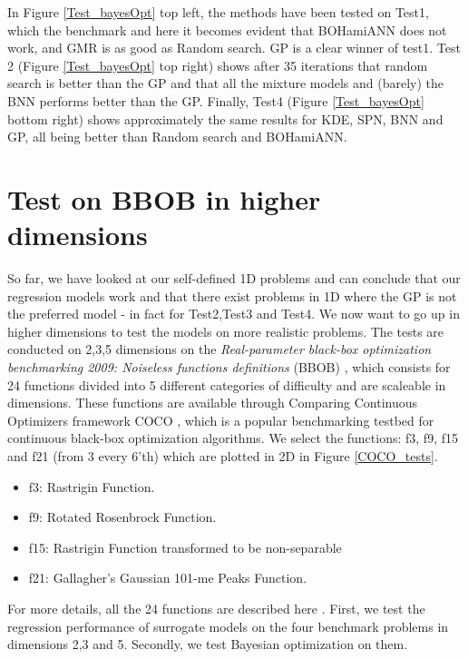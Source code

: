 In Figure \ref{Test_bayesOpt} top left, the methods have been tested on Test1, which the benchmark
and here it becomes evident that BOHamiANN does not work, and GMR is as good as Random search. GP is
a clear winner of test1. Test 2 (Figure \ref{Test_bayesOpt} top right) shows after 35 iterations
that random search is better than the GP and that all the mixture models and (barely) the BNN
performs better than the GP. Finally, Test4 (Figure \ref{Test_bayesOpt} bottom right) shows
approximately the same results for KDE, SPN, BNN and GP, all being better than Random search and
BOHamiANN. 

\section{Test on BBOB in higher dimensions}
So far, we have looked at our self-defined 1D problems and can conclude that our regression models
work and that there exist problems in 1D where the GP is not the preferred model - in fact for
Test2,Test3 and Test4. We now want to go up in higher dimensions to test the models on more
realistic problems. The tests are conducted on 2,3,5 dimensions on the \textit{Real-parameter
black-box optimization benchmarking 2009: Noiseless functions definitions} (BBOB)
\cite{hansen2009real}, which consists for 24 functions divided into 5 different categories of
difficulty and are scaleable in dimensions. These functions are available through Comparing
Continuous Optimizers framework COCO \cite{COCO}, which is a popular benchmarking testbed for
continuous black-box optimization algorithms. We select the functions: f3, f9, f15 and
f21 (from 3 every 6'th) which are plotted in 2D in Figure \ref{COCO_tests}.
\begin{itemize}[noitemsep]
  \item f3: Rastrigin Function.
  \item f9: Rotated Rosenbrock Function.
  \item f15: Rastrigin Function transformed to be non-separable
  \item f21: Gallagher’s Gaussian 101-me Peaks Function.
\end{itemize}
For more details, all the 24 functions are described here \cite{hansen2009real}. First, we test the
regression performance of surrogate models on the four benchmark problems in dimensions 2,3 and 5.
Secondly, we test Bayesian optimization on them. 

